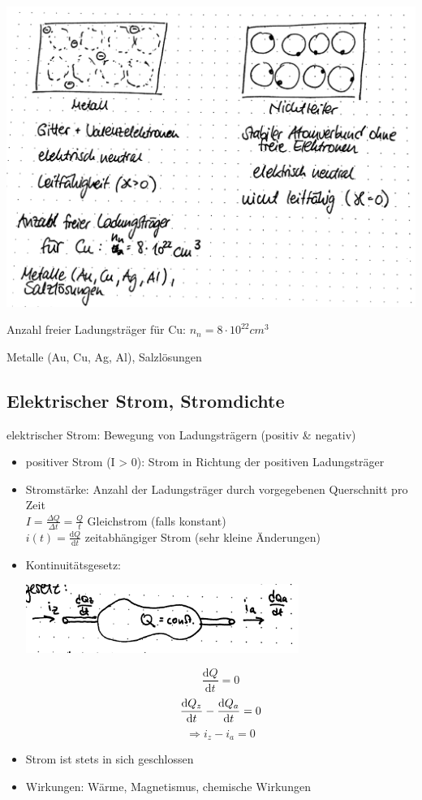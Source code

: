 \includegraphics[width=\textwidth]{img/1_5}

Anzahl freier Ladungsträger für Cu: $n_n = 8 \cdot 10^{22}cm^3$

Metalle (Au, Cu, Ag, Al), Salzlösungen

\subsection{Elektrischer Strom, Stromdichte}

elektrischer Strom: Bewegung von Ladungsträgern (positiv \& negativ)

\begin{itemize}
	\item positiver Strom (I > 0): Strom in Richtung der positiven Ladungsträger
	\item Stromstärke: Anzahl der Ladungsträger durch vorgegebenen Querschnitt pro Zeit\\
		$I = \frac{\Delta Q}{\Delta t} = \frac{Q}{t}$ \Ra Gleichstrom (falls konstant)\\
		$i(t) = \frac{\mathrm{d}Q}{\mathrm{d}t}$ \Ra zeitabhängiger Strom (sehr kleine Änderungen)
	\item Kontinuitätsgesetz:\\
		\begin{center}
			\includegraphics[width=0.7\textwidth]{img/1_6}
		\end{center}
		$$\frac{\mathrm{d}Q}{\mathrm{d}t}=0$$
		$$\frac{\mathrm{d} Q_z}{\mathrm{d} t} - \frac{\mathrm{d} Q_a}{\mathrm{d} t} = 0$$
		$$\Rightarrow i_z - i_a = 0$$
	\item Strom ist stets in sich geschlossen
	\item Wirkungen: Wärme, Magnetismus, chemische Wirkungen
\end{itemize}
